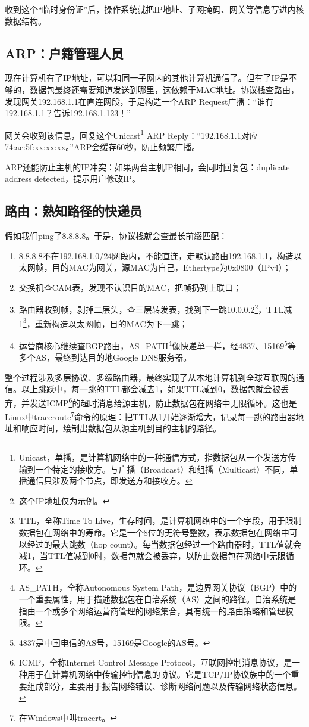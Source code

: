 收到这个“临时身份证”后，操作系统就把IP地址、子网掩码、网关等信息写进内核数据结构。

\subsection{ARP：户籍管理人员}

现在计算机有了IP地址，可以和同一子网内的其他计算机通信了。但有了IP是不够的，数据包最终还需要知道发送到哪里，这依赖于MAC地址。协议栈查路由，发现网关192.168.1.1在直连网段，于是构造一个ARP Request广播：“谁有192.168.1.1？告诉192.168.1.123！”

网关会收到该信息，回复这个Unicast\footnote{Unicast，单播，是计算机网络中的一种通信方式，指数据包从一个发送方传输到一个特定的接收方。与广播（Broadcast）和组播（Multicast）不同，单播通信只涉及两个节点，即发送方和接收方。} ARP Reply：“192.168.1.1对应74:ac:5f:xx:xx:xx。”ARP会缓存60秒，防止频繁广播。

ARP还能防止主机的IP冲突：如果两台主机IP相同，会同时回复包：duplicate address detected，提示用户修改IP。

\subsection{路由：熟知路径的快递员}

假如我们ping了8.8.8.8。于是，协议栈就会查最长前缀匹配：
\begin{enumerate}
  \item 8.8.8.8不在192.168.1.0/24网段内，不能直连，走默认路由192.168.1.1，构造以太网帧，目的MAC为网关，源MAC为自己，Ethertype为0x0800（IPv4）；
  \item 交换机查CAM表，发现不认识目的MAC，把帧扔到上联口；
  \item 路由器收到帧，剥掉二层头，查三层转发表，找到下一跳10.0.0.2\footnote{这个IP地址仅为示例。}，TTL减1\footnote{TTL，全称Time To Live，生存时间，是计算机网络中的一个字段，用于限制数据包在网络中的寿命。它是一个8位的无符号整数，表示数据包在网络中可以经过的最大跳数（hop count）。每当数据包经过一个路由器时，TTL值就会减1，当TTL值减到0时，数据包就会被丢弃，以防止数据包在网络中无限循环。}，重新构造以太网帧，目的MAC为下一跳；
  \item 运营商核心继续查BGP路由，AS\_PATH\footnote{AS\_PATH，全称Autonomous System Path，是边界网关协议（BGP）中的一个重要属性，用于描述数据包在自治系统（AS）之间的路径。自治系统是指由一个或多个网络运营商管理的网络集合，具有统一的路由策略和管理权限。}像快递单一样，经4837、15169\footnote{4837是中国电信的AS号，15169是Google的AS号。}等多个AS，最终到达目的地Google DNS服务器。
\end{enumerate}
整个过程涉及多层协议、多级路由器，最终实现了从本地计算机到全球互联网的通信。以上跳跃中，每一跳的TTL都会减去1，如果TTL减到0，数据包就会被丢弃，并发送ICMP\footnote{ICMP，全称Internet Control Message Protocol，互联网控制消息协议，是一种用于在计算机网络中传输控制信息的协议。它是TCP/IP协议族中的一个重要组成部分，主要用于报告网络错误、诊断网络问题以及传输网络状态信息。}的超时消息给源主机，防止数据包在网络中无限循环。这也是Linux中traceroute\footnote{在Windows中叫tracert。}命令的原理：把TTL从1开始逐渐增大，记录每一跳的路由器地址和响应时间，绘制出数据包从源主机到目的主机的路径。

